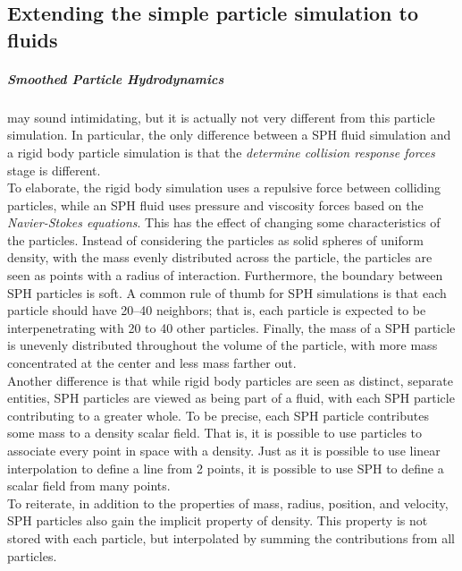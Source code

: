 \documentclass[]{article}
\begin{document}
	\subsection{Extending the simple particle simulation to fluids}
	\subparagraph{\textit{Smoothed Particle Hydrodynamics}} may sound intimidating, but it is actually not very different from 
	this particle simulation. In particular, the only difference between a SPH fluid simulation and a rigid body particle 
	simulation is that the \textit{determine collision response forces} stage is different.\\
	
	To elaborate, the rigid body simulation uses a repulsive force between colliding particles, while an SPH fluid uses
	pressure and viscosity forces based on the \textit{Navier-Stokes equations}. This has the effect of changing some 
	characteristics of the particles. Instead of considering the particles as solid spheres of uniform density, with the
	mass evenly distributed across the particle, the particles are seen as points with a radius of interaction. 
	Furthermore, the boundary between SPH particles is soft. A common rule of thumb for SPH simulations is that each 
	particle should have 20--40 neighbors; that is, each particle is expected to be interpenetrating with 20 to 40 other
	particles. Finally, the mass of a SPH particle is unevenly distributed throughout the volume of the particle, with
	more mass concentrated at the center and less mass farther out.\\
	
	Another difference is that while rigid body particles are seen as distinct, separate entities, SPH particles are 
	viewed as being part of a fluid, with each SPH particle contributing to a greater whole. To be precise, each SPH 
	particle contributes some mass to a density scalar field. That is, it is possible to use particles to associate 
	every point in space with a density. Just as it is possible to use linear interpolation to define a line from 2 
	points, it is possible to use SPH to define a scalar field from many points.\\
	
	To reiterate, in addition to the properties of mass, radius, position, and velocity, SPH particles also gain the 
	implicit property of density. This property is not stored with each particle, but interpolated by summing the 
	contributions from all particles.\\
	
\end{document}
